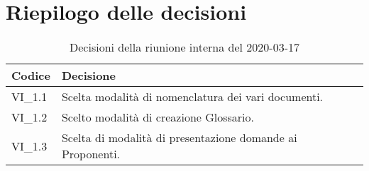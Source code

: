 \section{Riepilogo delle decisioni}
\begin{longtable}{ 
	 >{\centering}p{} >{}p{} }
	
	\caption{Decisioni della riunione interna del 2020-03-17}\\	
	
	\textbf{\color{white}Codice} & 
	\textbf{\color{white}Decisione} 
	\tabularnewline  
	\endhead
	
	VI\_1.1 & Scelta modalità di nomenclatura dei vari documenti. \\
	VI\_1.2 & Scelto modalità di creazione Glossario. \\
	VI\_1.3 & Scelta di modalità di presentazione domande ai Proponenti. \\
	
\end{longtable}